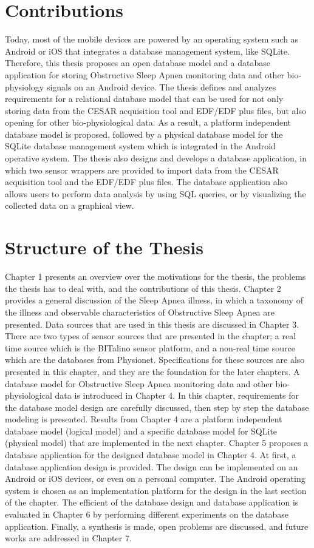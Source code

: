 \section{Contributions}
Today, most of the mobile devices are powered by an operating system such as Android or iOS that integrates a database management system, like SQLite. Therefore, this thesis proposes an open database model and a database application for storing Obstructive Sleep Apnea monitoring data and other bio-physiology signals on an Android device. The thesis defines and analyzes requirements for a relational database model that can be used for not only storing data from the CESAR acquisition tool\citep{SP} and EDF/EDF plus files, but also opening for other bio-physiological data. As a result, a platform independent database model is proposed, followed by a physical database model for the SQLite database management system which is integrated in the Android operative system. The thesis also designs and develops a database application, in which two sensor wrappers are provided to import data from the CESAR acquisition tool and the EDF/EDF plus files. The database application also allows users to perform data analysis by using SQL queries, or by visualizing the collected data on a graphical view.
\section{Structure of the Thesis}
Chapter 1 presents an overview over the motivations for the thesis, the problems the thesis has to deal with, and the contributions of this thesis. Chapter 2 provides a general discussion of the Sleep Apnea illness, in which a taxonomy of the illness and observable characteristics of Obstructive Sleep Apnea are presented. Data sources that are used in this thesis are discussed in Chapter 3. There are two types of sensor sources that are presented in the chapter; a real time source which is the BITalino sensor platform, and a non-real time source which are the databases from Physionet. Specifications for these sources are also presented in this chapter, and they are the foundation for the later chapters. A database model for Obstructive Sleep Apnea monitoring data and other bio-physiological data is introduced in Chapter 4. In this chapter, requirements for the database model design are carefully discussed, then step by step the database modeling is presented. Results from Chapter 4 are a platform independent database model (logical model) and a specific database model for SQLite (physical model) that are implemented in the next chapter. Chapter 5 proposes a database application for the designed database model in Chapter 4. At first, a database application design is provided. The design can be implemented on an Android or iOS devices, or even on a personal computer. The Android operating system is chosen as an implementation platform for the design in the last section of the chapter. The efficient of the database design and database application is evaluated in Chapter 6 by performing different experiments on the database application. Finally, a synthesis is made, open problems are discussed, and future works are addressed in Chapter 7.

